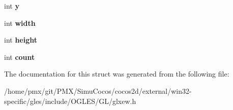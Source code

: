 \begin{DoxyCompactItemize}
int {\bfseries y}
\item 
\mbox{\label{structGLXBufferClobberEventSGIX_adad23535733161528427584a42bfc6eb}} 
int {\bfseries width}
\item 
\mbox{\label{structGLXBufferClobberEventSGIX_a7838dbabb76c22aa8241310a3f2363ea}} 
int {\bfseries height}
\item 
\mbox{\label{structGLXBufferClobberEventSGIX_ad8f4f0aae058e0a1ff542679823e37a9}} 
int {\bfseries count}
\end{DoxyCompactItemize}


The documentation for this struct was generated from the following file\+:\begin{DoxyCompactItemize}
\item 
/home/pmx/git/\+P\+M\+X/\+Simu\+Cocos/cocos2d/external/win32-\/specific/gles/include/\+O\+G\+L\+E\+S/\+G\+L/glxew.\+h\end{DoxyCompactItemize}
